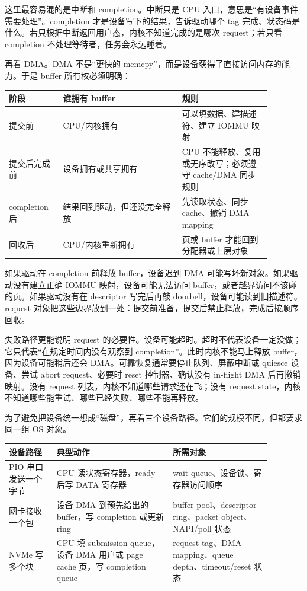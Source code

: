 这里最容易混的是中断和 completion。中断只是 CPU 入口，意思是“有设备事件需要处理”。completion 才是设备写下的结果，告诉驱动哪个 tag 完成、状态码是什么。若只根据中断返回用户态，内核不知道完成的是哪次 request；若只看 completion 不处理等待者，任务会永远睡着。

再看 DMA。DMA 不是“更快的 memcpy”，而是设备获得了直接访问内存的能力。于是 buffer 所有权必须明确：

\begin{longtable}{p{0.18\linewidth}p{0.4\linewidth}p{0.3\linewidth}}
\toprule
阶段 & 谁拥有 buffer & 规则 \\
\midrule
提交前 & CPU/内核拥有 & 可以填数据、建描述符、建立 IOMMU 映射 \\
提交后完成前 & 设备拥有或共享拥有 & CPU 不能释放、复用或无序改写；必须遵守 cache/DMA 同步规则 \\
completion 后 & 结果回到驱动，但还没完全释放 & 先读取状态、同步 cache、撤销 DMA mapping \\
回收后 & CPU/内核重新拥有 & 页或 buffer 才能回到分配器或上层对象 \\
\bottomrule
\end{longtable}

如果驱动在 completion 前释放 buffer，设备迟到 DMA 可能写坏新对象。如果驱动没有建立正确 IOMMU 映射，设备可能无法访问 buffer，或者越界访问不该碰的页。如果驱动没有在 descriptor 写完后再敲 doorbell，设备可能读到旧描述符。request 对象把这些边界放到一处：提交前准备，提交后禁止释放，完成后按顺序回收。

失败路径更能说明 request 的必要性。设备可能超时。超时不代表设备一定没做；它只代表“在规定时间内没有观察到 completion”。此时内核不能马上释放 buffer，因为设备可能稍后还会 DMA。可靠恢复通常要停止队列、屏蔽中断或 quiesce 设备、尝试 abort request、必要时 reset 控制器、确认没有 in-flight DMA 后再撤销映射。没有 request 列表，内核不知道哪些请求还在飞；没有 request state，内核不知道哪些能重试、哪些已经失败、哪些不能再释放。

为了避免把设备统一想成“磁盘”，再看三个设备路径。它们的规模不同，但都要求同一组 OS 对象。

\begin{longtable}{p{0.16\linewidth}p{0.39\linewidth}p{0.33\linewidth}}
\toprule
设备路径 & 典型动作 & 所需对象 \\
\midrule
PIO 串口发送一个字节 & CPU 读状态寄存器，ready 后写 DATA 寄存器 & wait queue、设备锁、寄存器访问顺序 \\
网卡接收一个包 & 设备 DMA 到预先给出的 buffer，写 completion 或更新 ring & buffer pool、descriptor ring、packet object、NAPI/poll 状态 \\
NVMe 写多个块 & CPU 填 submission queue，设备 DMA 用户或 page cache 页，写 completion queue & request tag、DMA mapping、queue depth、timeout/reset 状态 \\
\bottomrule
\end{longtable}

